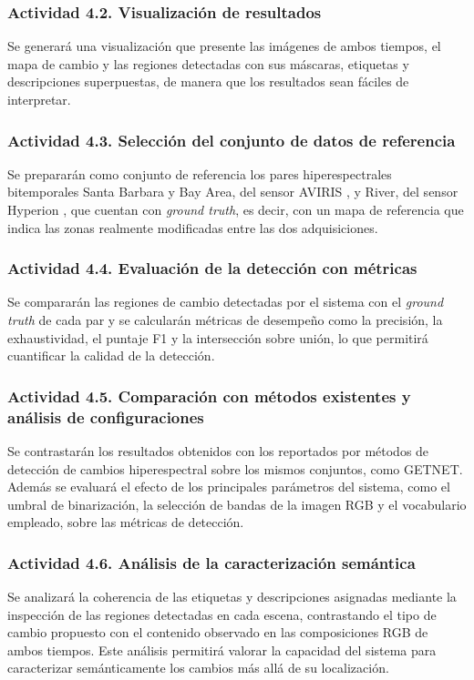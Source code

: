 \subsubsection{Actividad 4.2. Visualización de resultados}

Se generará una visualización que presente las imágenes de ambos tiempos, el mapa de cambio y las regiones detectadas con sus máscaras, etiquetas y descripciones superpuestas, de manera que los resultados sean fáciles de interpretar.

\subsubsection{Actividad 4.3. Selección del conjunto de datos de referencia}

Se prepararán como conjunto de referencia los pares hiperespectrales bitemporales Santa Barbara y Bay Area, del sensor AVIRIS \parencite{hasanlou2018hyperspectral}, y River, del sensor Hyperion \parencite{wang2019getnet}, que cuentan con \textit{ground truth}, es decir, con un mapa de referencia que indica las zonas realmente modificadas entre las dos adquisiciones.

\subsubsection{Actividad 4.4. Evaluación de la detección con métricas}

Se compararán las regiones de cambio detectadas por el sistema con el \textit{ground truth} de cada par y se calcularán métricas de desempeño como la precisión, la exhaustividad, el puntaje F1 y la intersección sobre unión, lo que permitirá cuantificar la calidad de la detección.

\subsubsection{Actividad 4.5. Comparación con métodos existentes y análisis de configuraciones}

Se contrastarán los resultados obtenidos con los reportados por métodos de detección de cambios hiperespectral sobre los mismos conjuntos, como GETNET. Además se evaluará el efecto de los principales parámetros del sistema, como el umbral de binarización, la selección de bandas de la imagen RGB y el vocabulario empleado, sobre las métricas de detección.

\subsubsection{Actividad 4.6. Análisis de la caracterización semántica}

Se analizará la coherencia de las etiquetas y descripciones asignadas mediante la inspección de las regiones detectadas en cada escena, contrastando el tipo de cambio propuesto con el contenido observado en las composiciones RGB de ambos tiempos. Este análisis permitirá valorar la capacidad del sistema para caracterizar semánticamente los cambios más allá de su localización.
